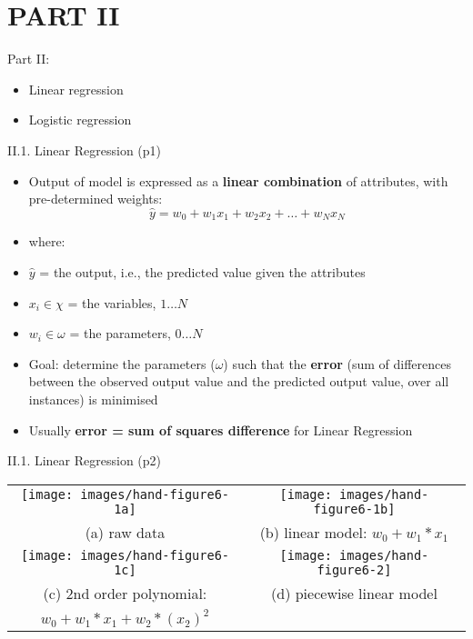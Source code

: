 \documentclass[handout]{beamer}
\newcommand{\strong}[1]{\textbf{\color{teal} #1}}
\begin{document}
\section{PART II}
\begin{frame}{Part II: }
\begin{itemize}
\item[II.1] Linear regression
\item[II.2] Logistic regression
\end{itemize}
\end{frame}
\begin{frame}{II.1. Linear Regression (p1)}
\begin{itemize}
\item Output of model is expressed as a \strong{linear combination} of attributes, with pre-determined weights:
\[
\hat{y} = w_0 + w_1 x_1 + w_2 x_2 + \ldots + w_N x_N
\]
\item[] where:
\item $\hat{y}$ = the output, i.e., the predicted value given the attributes
\item $x_i \in \chi$ = the variables, $1 \ldots N$
\item $w_i \in \omega$ = the parameters, $0 \ldots N$
\item Goal: determine the parameters ($\omega$) such that the \strong{error} (sum of differences between the observed output value and the predicted output value, over all instances) is minimised
\item Usually \strong{error = sum of squares difference} for Linear Regression
\end{itemize}
\end{frame}
\begin{frame}{II.1. Linear Regression (p2)}
\begin{center}
\begin{tabular}{cc}
\texttt{[image: images/hand-figure6-1a]} &
\texttt{[image: images/hand-figure6-1b]} \\
(a) raw data & (b) linear model: $w_0 + w_1 * x_1$ \\
\texttt{[image: images/hand-figure6-1c]} &
\texttt{[image: images/hand-figure6-2]} \\
(c) 2nd order polynomial: & (d) piecewise linear model \\
{\footnotesize $w_0 + w_1 * x_1 + w_2 * (x_2)^2$} & \\
\end{tabular}\\
\cite[Fig 6.1-6.2]{hand-et-al:2001}
\end{center}
\end{frame}
\end{document}
